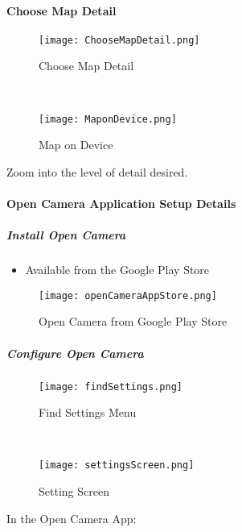  \paragraph[Choose Map Detail]{Choose Map Detail\texorpdfstring{\\}{}}
 \begin{wrapfigure}{r}{0.5\textwidth}
 \centering
     \texttt{[image: ChooseMapDetail.png]}
 \caption{Choose Map Detail}
 \vspace{.25in}

 \HRule \\[.4cm] %
 \vspace{.25in}

     \texttt{[image: MaponDevice.png]}
 \caption{Map on Device}
 \end{wrapfigure}
 Zoom into the level of detail desired.
 \vspace{1in}

 \vspace{3.5in}

 \clearpage
 \paragraph{Open Camera Application Setup Details}
 \subparagraph{Install Open Camera}
 \begin{itemize}
 \item Available from the Google Play Store
 \end{itemize}
 \begin{figure}[h!]
 \centering
     \texttt{[image: openCameraAppStore.png]}
 \caption{Open Camera from Google Play Store}
 \end{figure}

 \clearpage
 \subparagraph{Configure Open Camera}
 \begin{wrapfigure}{r}{0.5\textwidth}
 \centering
     \texttt{[image: findSettings.png]}
 \caption{Find Settings Menu}
 \vspace{.25in}

 \HRule \\[.4cm] %
 \vspace{.25in}

     \texttt{[image: settingsScreen.png]}
 \caption{Setting Screen}
 \end{wrapfigure}
 In the Open Camera App:
 \vspace{2.5in}

